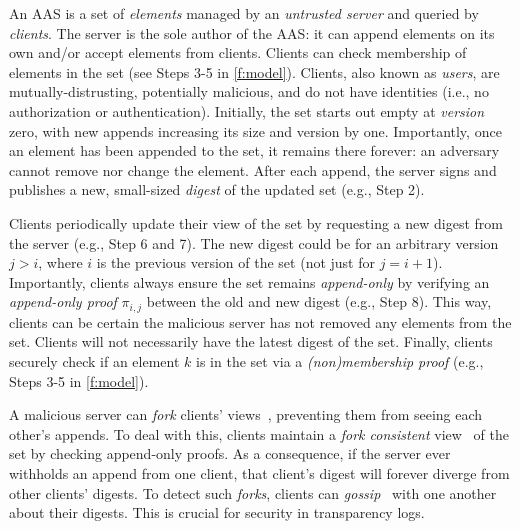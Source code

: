 An AAS is a set of \textit{elements} managed by an \textit{untrusted server} and queried by \textit{clients}.
The server is the sole author of the AAS: it can append elements on its own and/or accept elements from clients.
Clients can check membership of elements in the set (see Steps 3-5 in \cref{f:model}).
Clients, also known as \textit{users}, are mutually-distrusting, potentially malicious, and do not have identities (i.e., no authorization or authentication).
Initially, the set starts out empty at \textit{version} zero, with new appends increasing its size and version by one.
Importantly, once an element has been appended to the set, it remains there forever: an adversary cannot remove nor change the element.
After each append, the server signs and publishes a new, small-sized \emph{digest} of the updated set (e.g., Step 2).

Clients periodically update their view of the set by requesting a new digest from the server (e.g., Step 6 and 7).
The new digest could be for an arbitrary version $j > i$, where $i$ is the previous version of the set (not just for $j = i+1$).
Importantly, clients always ensure the set remains \textit{append-only} by verifying an \textit{append-only proof} $\pi_{i,j}$ between the old and new digest (e.g., Step 8).
This way, clients can be certain the malicious server has not removed any elements from the set.
Clients will not necessarily have the latest digest of the set.
Finally, clients securely check if an element $k$ is in the set via a \emph{(non)membership proof} (e.g., Steps 3-5 in \cref{f:model}).

A malicious server can \emph{fork} clients' views~\cite{sundrosdi}, preventing them from seeing each other's appends.
To deal with this, clients maintain a \textit{fork consistent} view~\cite{beyondonethird,sundrosdi} of the set by checking append-only proofs.
As a consequence, if the server ever withholds an append from one client, that client's digest will forever diverge from other clients' digests.
To detect such \textit{forks}, clients can \textit{gossip}~\cite{ct-gossip,cosi,catena,DahlbergPullsVestin2018} with one another about their digests.
This is crucial for security in transparency logs.

